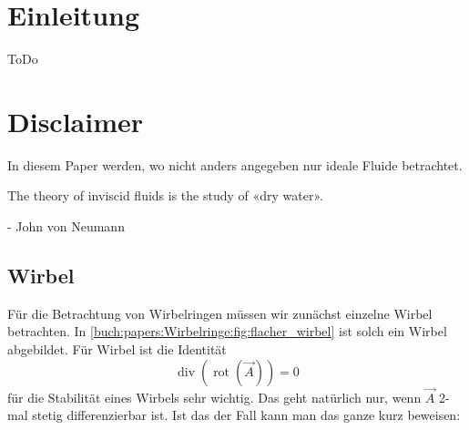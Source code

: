 \section{Einleitung}



ToDo

\section*{Disclaimer}

In diesem Paper werden, wo nicht anders angegeben nur ideale Fluide betrachtet.

\begin{displayquote}
    The theory of inviscid fluids is the study of «dry water».

    - John von Neumann\cite{Wirbelringe:feynman1964lectures}
\end{displayquote}

\subsection{Wirbel}



Für die Betrachtung von Wirbelringen müssen wir zunächst einzelne Wirbel betrachten. 
In \ref{buch:papers:Wirbelringe:fig:flacher_wirbel} ist solch ein Wirbel abgebildet. 
Für Wirbel ist die Identität
\[
\operatorname{div} \left( \operatorname{rot} \left( \vec{A} \right) \right) 
= 
0
\]
für die Stabilität eines Wirbels sehr wichtig. 
Das geht natürlich nur, wenn \(\vec{A}\) 2-mal stetig differenzierbar ist. 
Ist das der Fall kann man das ganze kurz beweisen:

